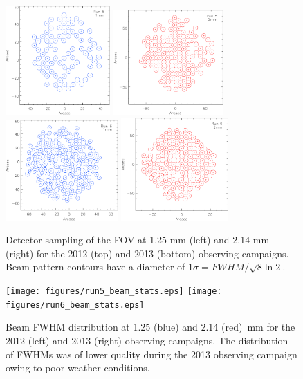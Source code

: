 \begin{figure}[t!]
\includegraphics[width=4cm]{figures/run5_fpg_1mm.eps}
\includegraphics[width=4.2cm]{figures/run5_fpg_2mm.eps}\\
\includegraphics[width=4.3cm]{figures/run6_fpg_1mm.eps}
\includegraphics[width=4.1cm]{figures/run6_fpg_2mm.eps}
\caption{Detector sampling of the FOV at 1.25 mm (left) and 2.14 mm (right) for the 2012 (top) and 2013 (bottom) observing campaigns. Beam
  pattern contours have a diameter of $1\sigma=FWHM/\sqrt{8\ln 2}$.}
\label{fig:run6_fpg}
\end{figure}


\begin{figure}[t!]
\texttt{[image: figures/run5\_beam\_stats.eps]}
\texttt{[image: figures/run6\_beam\_stats.eps]}
\caption{Beam FWHM distribution at 1.25 (blue) and 2.14 (red)~mm for the 2012 (left) and 2013 (right) observing campaigns. 
The distribution of FWHMs was of lower quality during the 2013 observing campaign owing to
  poor weather conditions.}
\label{fig:run6_beam_stats}
\end{figure}

